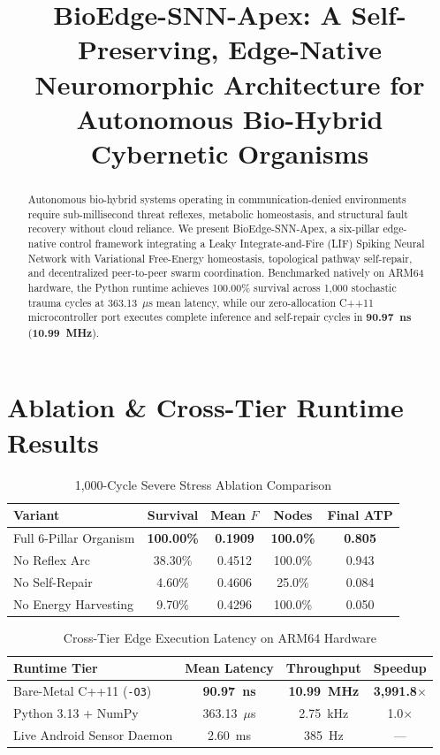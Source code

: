 \documentclass[conference]{IEEEtran}
\title{BioEdge-SNN-Apex: A Self-Preserving, Edge-Native Neuromorphic Architecture for Autonomous Bio-Hybrid Cybernetic Organisms}
\author{\IEEEauthorblockN{KrypticKode007 — Autonomous Edge Systems Research}}
\begin{document}
\maketitle
\begin{abstract}
Autonomous bio-hybrid systems operating in communication-denied environments require sub-millisecond threat reflexes, metabolic homeostasis, and structural fault recovery without cloud reliance. We present BioEdge-SNN-Apex, a six-pillar edge-native control framework integrating a Leaky Integrate-and-Fire (LIF) Spiking Neural Network with Variational Free-Energy homeostasis, topological pathway self-repair, and decentralized peer-to-peer swarm coordination. Benchmarked natively on ARM64 hardware, the Python runtime achieves 100.00\% survival across 1,000 stochastic trauma cycles at 363.13~$\mu$s mean latency, while our zero-allocation C++11 microcontroller port executes complete inference and self-repair cycles in \textbf{90.97~ns} (\textbf{10.99~MHz}).
\end{abstract}

\section{Ablation \& Cross-Tier Runtime Results}
\begin{table}[h]
\centering
\caption{1,000-Cycle Severe Stress Ablation Comparison}
\begin{tabular}{lcccc}
\toprule
\textbf{Variant} & \textbf{Survival} & \textbf{Mean $F$} & \textbf{Nodes} & \textbf{Final ATP} \\
\midrule
Full 6-Pillar Organism & \textbf{100.00\%} & \textbf{0.1909} & \textbf{100.0\%} & \textbf{0.805} \\
No Reflex Arc & 38.30\% & 0.4512 & 100.0\% & 0.943 \\
No Self-Repair & 4.60\% & 0.4606 & 25.0\% & 0.084 \\
No Energy Harvesting & 9.70\% & 0.4296 & 100.0\% & 0.050 \\
\bottomrule
\end{tabular}
\end{table}

\begin{table}[h]
\centering
\caption{Cross-Tier Edge Execution Latency on ARM64 Hardware}
\begin{tabular}{lccc}
\toprule
\textbf{Runtime Tier} & \textbf{Mean Latency} & \textbf{Throughput} & \textbf{Speedup} \\
\midrule
Bare-Metal C++11 (\texttt{-O3}) & \textbf{90.97~ns} & \textbf{10.99~MHz} & \textbf{3,991.8$\times$} \\
Python 3.13 + NumPy & 363.13~$\mu$s & 2.75~kHz & 1.0$\times$ \\
Live Android Sensor Daemon & 2.60~ms & 385~Hz & --- \\
\bottomrule
\end{tabular}
\end{table}
\end{document}
